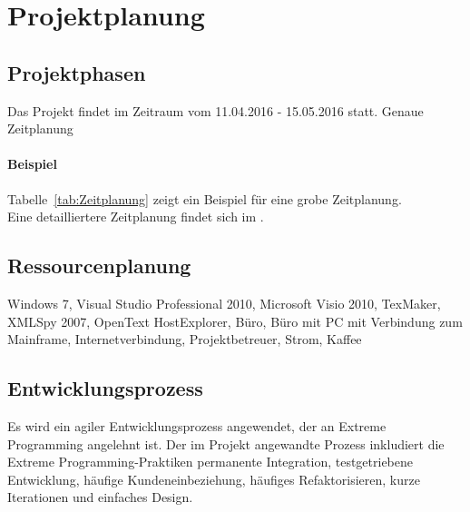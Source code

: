 \section{Projektplanung} 
\label{sec:Projektplanung}


\subsection{Projektphasen}
\label{sec:Projektphasen}
Das Projekt findet im Zeitraum vom 11.04.2016 - 15.05.2016 statt.
Genaue Zeitplanung

\paragraph{Beispiel}
Tabelle~\ref{tab:Zeitplanung} zeigt ein Beispiel für eine grobe Zeitplanung.
\\
Eine detailliertere Zeitplanung findet sich im .


\subsection{Ressourcenplanung}
\label{sec:Ressourcenplanung}
Windows 7, Visual Studio Professional 2010, Microsoft Visio 2010, TexMaker, XMLSpy 2007, OpenText HostExplorer, Büro, Büro mit PC mit Verbindung zum Mainframe, Internetverbindung, Projektbetreuer, Strom, Kaffee


\subsection{Entwicklungsprozess}
\label{sec:Entwicklungsprozess}
Es wird ein agiler Entwicklungsprozess angewendet, der an Extreme Programming angelehnt ist. Der im Projekt angewandte Prozess inkludiert die Extreme Programming-Praktiken permanente Integration, testgetriebene Entwicklung, häufige Kundeneinbeziehung, häufiges Refaktorisieren, kurze Iterationen und einfaches Design. 






